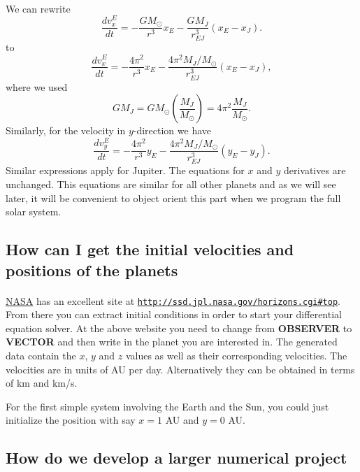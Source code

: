 \documentclass[%
oneside,                 %
final,                   %
10pt]{article}
\begin{document}
\paragraph{}
We can rewrite 
\[
   \frac{dv_x^E}{dt}=-\frac{GM_{\odot}}{r^3}x_E-\frac{GM_J}{r_{EJ}^3}(x_E-x_J).
\]
to
\[
   \frac{dv_x^E}{dt}=-\frac{4\pi^2}{r^3}x_E-\frac{4\pi^2M_J/M_{\odot}}{r_{EJ}^3}(x_E-x_J),
\]
where we used 
\[
GM_J = GM_{\odot}\left(\frac{M_J}{M_{\odot}}\right)=4\pi^2 \frac{M_J}{M_{\odot}}.
\]
Similarly, for the velocity in $y$-direction we have 
\[
   \frac{dv_y^E}{dt}=-\frac{4\pi^2}{r^3}y_E-\frac{4\pi^2M_J/M_{\odot}}{r_{EJ}^3}(y_E-y_J).
\]
Similar expressions apply for Jupiter. The equations for $x$ and $y$ 
derivatives are unchanged. This equations are similar for all other planets and as we will see later, it will be convenient to object orient this part when we program the full solar system.




\subsection{How can I get the initial velocities and positions of the planets}

\paragraph{}
\href{{http://www.nasa.gov/index.html}}{NASA} has an excellent site at \href{{http://ssd.jpl.nasa.gov/horizons.cgi#top}}{\nolinkurl{http://ssd.jpl.nasa.gov/horizons.cgi\#top}}.
From there you can extract initial conditions in order to start your differential equation solver.
At the above website you need to change from \textbf{OBSERVER} to \textbf{VECTOR} and then write in the planet you are interested in.
The generated data contain the $x$, $y$ and $z$ values as well as their corresponding velocities. The velocities are in units of AU per day.
Alternatively they can be obtained in terms of km and km/s. 

For the first simple system involving the Earth and the Sun, you could just initialize the position with say $x=1$ AU
and $y=0$ AU.



\subsection{How do we develop a larger numerical project}
\end{document}
